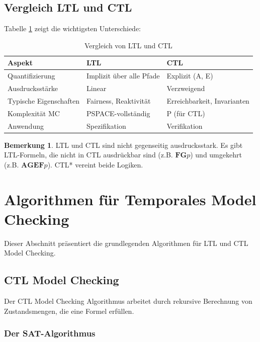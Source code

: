 ﻿\documentclass[a4paper,12pt]{article}
\theoremstyle{definition}
\newtheorem{remark}{Bemerkung}[section]
\begin{document}
\subsection{Vergleich LTL und CTL}

Tabelle \ref{tab:ltl_ctl_comparison} zeigt die wichtigsten Unterschiede:

\begin{table}[h]
	\centering
	\caption{Vergleich von LTL und CTL}
	\label{tab:ltl_ctl_comparison}
	\begin{tabular}{lll}
		\toprule
		Aspekt & LTL & CTL \\
		\midrule
		Quantifizierung & Implizit über alle Pfade & Explizit (A, E) \\
		Ausdrucksstärke & Linear & Verzweigend \\
		Typische Eigenschaften & Fairness, Reaktivität & Erreichbarkeit, Invarianten \\
		Komplexität MC & PSPACE-vollständig & P (für CTL) \\
		Anwendung & Spezifikation & Verifikation \\
		\bottomrule
	\end{tabular}
\end{table}

\begin{remark}
	LTL und CTL sind nicht gegenseitig ausdrucksstark. Es gibt LTL-Formeln, die nicht in CTL ausdrückbar sind (z.B. $\mathbf{FG}p$) und umgekehrt (z.B. $\mathbf{AG}\mathbf{EF}p$). CTL* vereint beide Logiken.
\end{remark}

\section{Algorithmen für Temporales Model Checking}

Dieser Abschnitt präsentiert die grundlegenden Algorithmen für LTL und CTL Model Checking.

\subsection{CTL Model Checking}

Der CTL Model Checking Algorithmus arbeitet durch rekursive Berechnung von Zustandsmengen, die eine Formel erfüllen.

\subsubsection{Der SAT-Algorithmus}
\end{document}
